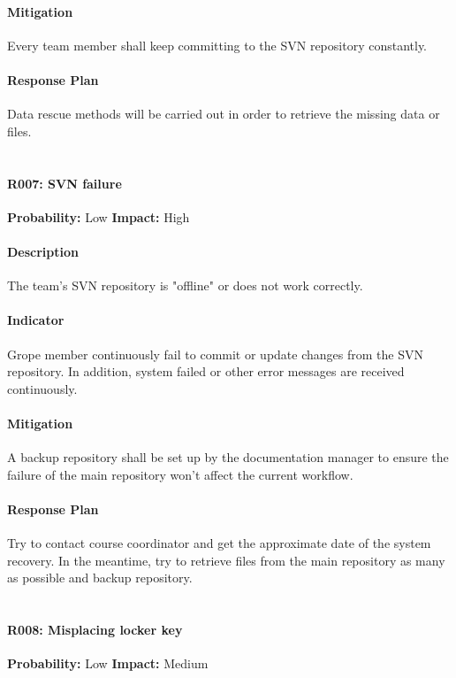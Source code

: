 \documentclass[11pt, a4paper]{report}
\begin{document}
	\paragraph{Mitigation}Every team member shall keep committing to the SVN repository constantly.
	\paragraph{Response Plan}Data rescue methods will be carried out in order to retrieve the missing data or files.\\\\

	\paragraph{R007: SVN failure} \hspace{1cm} \textbf{Probability: }Low\hspace{1cm}   \textbf{Impact: }High
	\paragraph{Description}The team's SVN repository is "offline" or does not work correctly.
	\paragraph{Indicator}Grope member continuously  fail to commit or update changes from the SVN repository. In addition, system failed or other error messages are received continuously.
	\paragraph{Mitigation}A backup repository shall be set up by the documentation manager to ensure the failure of the main repository won't affect the current workflow.
	\paragraph{Response Plan}Try to contact course coordinator and get the approximate date of the system recovery. In the meantime, try to retrieve files from the main repository as many as possible and backup repository.\\\\

\pagebreak

	\paragraph{R008: Misplacing locker key} \hspace{1cm} \textbf{Probability: }Low\hspace{1cm}   \textbf{Impact: }Medium
\end{document}

